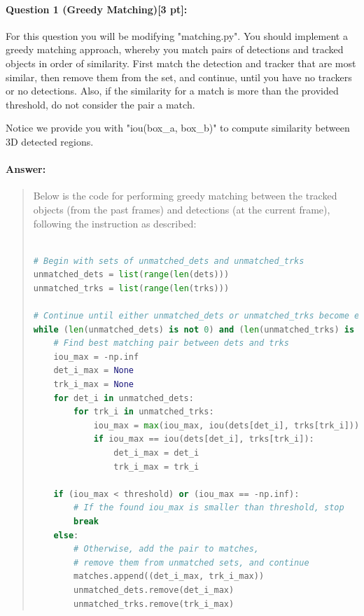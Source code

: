 \documentclass[11pt]{article}
\begin{document}
\paragraph{Question 1 (Greedy Matching)[3 pt]:}
For this question you will be modifying "matching.py". You should implement a greedy matching approach, whereby you match pairs of detections and tracked objects in order of similarity. First match the detection and tracker that are most similar, then remove them from the set, and continue, until you have no trackers or no detections. Also, if the similarity for a match is more than the provided threshold, do not consider the pair a match.

Notice we provide you with "iou(box\_a, box\_b)" to compute similarity between 3D detected regions.
\paragraph{Answer:} 
\begin{quote}

Below is the code for performing greedy matching between the tracked objects (from the past frames) and detections (at the current frame), following the instruction as described:

\begin{lstlisting}[language=Python, basicstyle=\scriptsize]

# Begin with sets of unmatched_dets and unmatched_trks
unmatched_dets = list(range(len(dets)))
unmatched_trks = list(range(len(trks)))

# Continue until either unmatched_dets or unmatched_trks become empty
while (len(unmatched_dets) is not 0) and (len(unmatched_trks) is not 0):
    # Find best matching pair between dets and trks
    iou_max = -np.inf
    det_i_max = None
    trk_i_max = None
    for det_i in unmatched_dets:
        for trk_i in unmatched_trks:
            iou_max = max(iou_max, iou(dets[det_i], trks[trk_i]))
            if iou_max == iou(dets[det_i], trks[trk_i]):
                det_i_max = det_i
                trk_i_max = trk_i
    
    if (iou_max < threshold) or (iou_max == -np.inf):
        # If the found iou_max is smaller than threshold, stop
        break
    else:
        # Otherwise, add the pair to matches, 
        # remove them from unmatched sets, and continue
        matches.append((det_i_max, trk_i_max))
        unmatched_dets.remove(det_i_max)
        unmatched_trks.remove(trk_i_max)

\end{lstlisting}

\end{quote}
\end{document}

